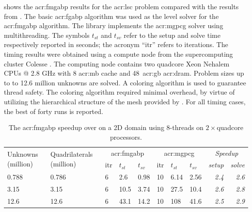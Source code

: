  shows the \gls{acr:fmgabp} results for the \gls{acr:lsc} problem compared with the results from .
The basic \gls{acr:fgabp} algorithm was used as the level solver for the \gls{acr:fmgabp} algorithm.
The library  implements the \gls{acr:mgpcg} solver using multithreading.
The symbols $t_{st}$ and $t_{sv}$ refer to the setup and solve time respectively reported in seconds; the acronym ``itr'' refers to iterations.
The timing results were obtained using a compute node from the supercomputing cluster Colesse \cite{bib:colesse}.
The computing node contains two quadcore Xeon Nehalem CPUs @ 2.8 GHz with 8 \gls{acr:mb} cache and 48~\gls{acr:gb} \gls{acr:dram}.
Problem sizes up to to 12.6 million unknowns are solved.
A coloring algorithm is used to guarantee thread safety.
The coloring algorithm required minimal overhead, by virtue of utilizing the hierarchical structure of the mesh provided by .
For all timing cases, the best of forty runs is reported.

\begin{table}
	\centering
	\begin{threeparttable}[c]
		\caption[The \acrshort{acr:fmgabp} speedup over  on a 2D domain.]{The \acrshort{acr:fmgabp} speedup over  on a 2D domain using 8-threads on $2\times$quadcore processors.} \label{tbl:lscItr}
		\begin{tabular}{llllllll>{\itshape}r>{\itshape}r} \toprule
			\multirow{2}{22mm}{Unknowns (million)} & \multirow{2}{27mm}{Quadrilaterals (million)} & \multicolumn{3}{c}{\gls{acr:fmgabp}} & \multicolumn{3}{c}{\gls{acr:mgpcg}} & \multicolumn{2}{c}{\textit{Speedup}}\tabularnewline
			\cmidrule(r){3-5} \cmidrule(r){6-8}\cmidrule(r){9-10}
			&       & itr & $t_{st} $ & $t_{sv}$ & itr & $t_{st}$ & $t_{sv}$ & setup & solve\tabularnewline
			\midrule
			0.788    & 0.786 & 6             & 2.6                & 0.98               & 10  & 6.14     & 2.56     & 2.4   & 2.6 \tabularnewline
			3.15     & 3.15  & 6             & 10.5               & 3.74               & 10  & 27.5     & 10.4     & 2.6   & 2.8 \tabularnewline
			12.6     & 12.6  & 6             & 43.1               & 14.2               & 10  & 108      & 41.6     & 2.5   & 2.9 \tabularnewline
			\bottomrule
		\end{tabular}
	\end{threeparttable}
\end{table}

